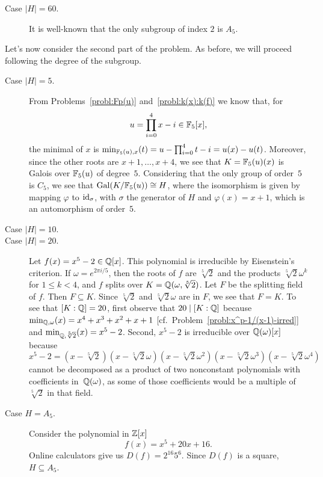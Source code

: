 \begin{solution}
\begin{description}
        \item[Case $|H|=60$.] It is well-known that the only subgroup of index $2$ is $A_5$.
    \end{description}
    Let's now consider the second part of the problem. As before, we will proceed following the degree of the subgroup.
    \begin{description}
        \item[Case $|H|=5$.] From Problems~\ref{probl:Fp(u)} and~\ref{probl:k(x):k(f)} we know that, for
        $$
            u = \prod_{i=0}^4x-i\in\mathbb F_5[x],
        $$
        the minimal of $x$ is $\operatorname{min}_{\mathbb F_5(u),x}(t)=u-\prod_{i=0}^4t-i=u(x)-u(t)$. Moreover, since the other roots are $x+1,\dots,x+4$, we see that $K=\mathbb F_5(u)(x)$ is Galois over $\mathbb F_5(u)$ of degree~$5$. Considering that the only group of order~$5$ is $C_5$, we see that $\operatorname{Gal}(K/\mathbb F_5(u))\cong H$, where the isomorphism is given by mapping $\varphi$ to $\operatorname{id}_\sigma$, with $\sigma$ the generator of $H$ and $\varphi(x)=x+1$, which is an automorphism of order~$5$.

        \item[Case $|H|=10$.]

        \item[Case $|H|=20$.] Let $f(x)=x^5-2\in\mathbb{Q}[x]$. This polynomial is irreducible by Eisenstein's criterion. If $\omega=e^{2\pi i/5}$, then the roots of $f$ are $\sqrt[5]2$ and the products $\sqrt[5]2\omega^k$ for $1\le k<4$, and $f$ splits over $K=\mathbb{Q}(\omega,\sqrt[5]2)$. Let $F$ be the splitting field of $f$. Then $F\subseteq K$. Since $\sqrt[5]2$ and $\sqrt[5]2\omega$ are in $F$, we see that $F=K$. To see that $[K:\mathbb{Q}]=20$, first observe that $20\mid[K:\mathbb{Q}]$ because $\operatorname{min}_{\mathbb{Q},\omega}(x)=x^4+x^3+x^2+x+1$ [cf.~Problem~\ref{probl:x^p-1/(x-1)-irred}] and $\operatorname{min}_{\mathbb{Q},\sqrt[5]2}(x)=x^5-2$. Second, $x^5-2$ is irreducible over $\mathbb{Q}(\omega)[x]$ because
        $$
            x^5-2 = (x-\sqrt[5]2)(x-\sqrt[5]2\omega)(x-\sqrt[5]2\omega^2)
                (x-\sqrt[5]2\omega^3)(x-\sqrt[5]2\omega^4)
        $$
        cannot be decomposed as a product of two nonconstant polynomials with coefficients in~$\mathbb{Q}(\omega)$, as some of those coefficients would be a multiple of $\sqrt[5]2$ in that field.
        
        \item[Case $H=A_5$.] Consider the polynomial in $\mathbb{Z}[x]$
        $$
            f(x) = x^5 + 20x + 16.
        $$
        Online calculators give us $D(f)=2^{16}5^6$. Since $D(f)$ is a square, $H\subseteq A_5$.
        

\end{description}
\end{solution}
